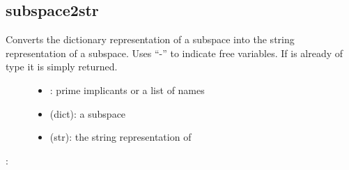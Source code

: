 \documentclass[letterpaper,10pt,english]{sphinxmanual}
\begin{document}
\subsection{subspace2str}
\label{\detokenize{StateTransitionGraphs:id11}}\label{\detokenize{StateTransitionGraphs:subspace2str}}

\begin{fulllineitems}
\label{\detokenize{StateTransitionGraphs:PyBoolNet.StateTransitionGraphs.subspace2str}}
Converts the dictionary representation of a subspace into the string representation of a subspace.
Uses “-” to indicate free variables.
If  is already of type  it is simply returned.
\begin{description}
\item[{}] \leavevmode\begin{itemize}
\item {} 
: prime implicants or a list of names

\item {} 
 (dict): a subspace

\end{itemize}

\item[{}] \leavevmode\begin{itemize}
\item {} 
 (str): the string representation of 

\end{itemize}

\end{description}

:

\begin{sphinxVerbatim}[commandchars=\\\{\}]
   
 
\end{sphinxVerbatim}

\end{fulllineitems}
\end{document}
